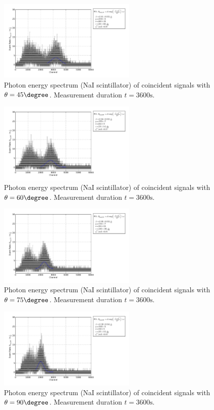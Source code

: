 \begin{figure}[h!]
  \centering
  \includegraphics[width=0.6\textwidth]{plots/naj_45.png}
  \caption{Photon energy spectrum (NaI scintillator) of coincident signals
  with $\theta=45\degree$. Measurement duration $t=3600\mathrm{s}$.}
  \label{fig:naj45}
\end{figure}
\begin{figure}[h!]
  \centering
  \includegraphics[width=0.6\textwidth]{plots/naj_60.png}
  \caption{Photon energy spectrum (NaI scintillator) of coincident signals
  with $\theta=60\degree$. Measurement duration $t=3600\mathrm{s}$.}
  \label{fig:naj60}
\end{figure}
\begin{figure}[h!]
  \centering
  \includegraphics[width=0.6\textwidth]{plots/naj_75.png}
  \caption{Photon energy spectrum (NaI scintillator) of coincident signals
  with $\theta=75\degree$. Measurement duration $t=3600\mathrm{s}$.}
  \label{fig:naj75}
\end{figure}
\begin{figure}[h!]
  \centering
  \includegraphics[width=0.6\textwidth]{plots/naj_90.png}
  \caption{Photon energy spectrum (NaI scintillator) of coincident signals
  with $\theta=90\degree$. Measurement duration $t=3600\mathrm{s}$.}
  \label{fig:naj90}
\end{figure}
